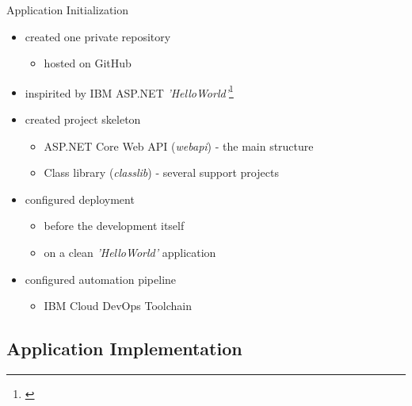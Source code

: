 \documentclass[]{beamer}
\begin{document}
    \begin{frame}{Application Initialization}
      \begin{itemize}
        \item created one private repository
        \begin{itemize}
          \item hosted on GitHub
        \end{itemize}
        \item inspirited by IBM ASP.NET \textit{'HelloWorld'}\footnote{\href{https://github.com/IBM-Cloud/aspnet-core-helloworld}{\color{urlcolor}{github.com/IBM-Cloud/aspnet-core-helloworld}}}
        \item created project skeleton
        \begin{itemize}
          \item ASP.NET Core Web API (\textit{webapi}) - the main structure
          \item Class library (\textit{classlib}) - several support projects
        \end{itemize}
        \item configured deployment
        \begin{itemize}
          \item before the development itself
          \item on a clean \textit{'HelloWorld'} application
        \end{itemize}
        \item configured automation pipeline
        \begin{itemize}
          \item IBM Cloud DevOps Toolchain
        \end{itemize}
      \end{itemize}
    \end{frame}

  \subsection{Application Implementation}
\end{document}
